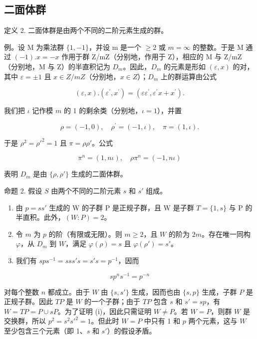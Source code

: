 \subsection{二面体群}

定义 2. 二面体群是由两个不同的二阶元素生成的群。

例。设 M 为乘法群 \(\{1,-1\}\)，并设 m 是一个 \(\geqslant2\) 或 \(m=\infty\) 的整数。于是 M 通过 \((-1).x=-x\) 作用于群 Z/mZ（分别地，作用于 Z），相应的 M 与 Z/mZ（分别地，M 与 Z）的半直积记为 \(D_{m}\)。因此，\(D_{m}\) 的元素是形如 \((\varepsilon,x)\) 的对，其中 \(\varepsilon=\pm1\) 且 \(x\in Z/mZ\)（分别地，\(x\in Z\)）；\(D_{m}\) 上的群运算由公式

\[
(\varepsilon , x). (\varepsilon^ {\prime}, x ^ {\prime}) = (\varepsilon \varepsilon^ {\prime}, \varepsilon^ {\prime} x + x ^ {\prime}).\tag{6}
\]

我们把 \(\iota\) 记作模 \(m\) 的 1 的剩余类（分别地，\(\iota = 1\)），并置

\[
\rho = (- 1, 0), \quad \rho^ {\prime} = (- 1, \iota), \quad \pi = (1, \iota).\tag{7}
\]

于是 \(\rho^2 = \rho'^2 = 1\) 且 \(\pi = \rho \rho'\)。公式

\[
\pi^ {n} = (1, n \iota), \quad \rho \pi^ {n} = (- 1, n \iota)\tag{8}
\]

表明 \(D_{m}\) 是由 \(\{\rho,\rho'\}\) 生成的二面体群。

命题 2. 假设 \(S\) 由两个不同的二阶元素 \(s\) 和 \(s'\) 组成。

\begin{enumerate}
\def\labelenumi{(\roman{enumi})}
\item
  由 \(p = ss'\) 生成的 W 的子群 P 是正规子群，且 W 是子群 \(T = \{1, s\}\) 与 P 的半直积。此外，\((W : P) = 2\)。
\item
  令 \(m\) 为 \(p\) 的阶（有限或无限）。则 \(m \geqslant 2\)，且 \(W\) 的阶为 \(2m\)。存在唯一同构 \(\varphi\)，从 \(D_m\) 到 \(W\)，满足 \(\varphi(\rho) = s\) 且 \(\varphi(\rho') = s'\)。
\item
  我们有 \(sps^{-1} = sss's = s's = p^{-1}\)，因而
\end{enumerate}

\[
s p ^ {n} s ^ {- 1} = p ^ {- n}\tag{9}
\]

对每个整数 \(n\) 都成立。由于 \(W\) 由 \(\{s, s'\}\) 生成，因而也由 \(\{s, p\}\) 生成，子群 \(P\) 是正规子群。因此 \(TP\) 是 \(W\) 的一个子群；由于 \(TP\) 包含 \(s\) 和 \(s' = sp\)，有 \(W = TP = P \cup sP\)。为了证明 (i)，因此只需证明 \(W \neq P\)。若 \(W = P\)，则群 \(W\) 是交换群，所以 \(p^2 = s^2 s'^2 = 1\)。但此时 \(W = P\) 中只有 1 和 \(p\) 两个元素，这与 \(W\) 至少包含三个元素（即 1、\(s\) 和 \(s'\)）的假设矛盾。

